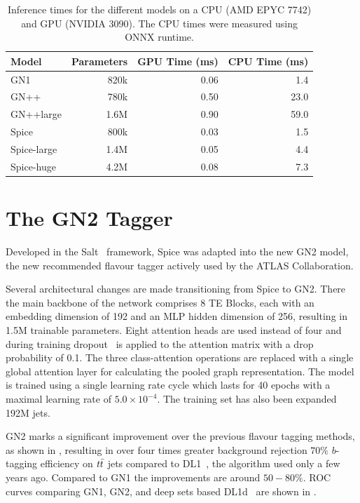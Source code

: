 \begin{table}[h!]
    \centering
    \begin{tabular}{lrrr}
        \toprule
        Model       & Parameters & GPU Time (ms) & CPU Time (ms) \\
        \midrule
        GN1         & 820k       & 0.06          & 1.4           \\
        GN++        & 780k       & 0.50          & 23.0          \\
        GN++large   & 1.6M       & 0.90          & 59.0          \\
        Spice       & 800k       & 0.03          & 1.5           \\
        Spice-large & 1.4M       & 0.05          & 4.4           \\
        Spice-huge  & 4.2M       & 0.08          & 7.3           \\
        \bottomrule
    \end{tabular}
    \caption{Inference times for the different models on a CPU (AMD EPYC 7742) and GPU (NVIDIA 3090). The CPU times were measured using ONNX runtime.}
    \label{tab:inference}
\end{table}

\FloatBarrier

\section{The GN2 Tagger}

Developed in the Salt~\cite{Salt} framework, Spice was adapted into the new GN2 model, the new recommended flavour tagger actively used by the ATLAS Collaboration.

Several architectural changes are made transitioning from Spice to GN2.
There the main backbone of the network comprises 8 TE Blocks, each with an embedding dimension of 192 and an MLP hidden dimension of 256, resulting in 1.5M trainable parameters.
Eight attention heads are used instead of four and during training dropout~\cite{Dropout} is applied to the attention matrix with a drop probability of 0.1.
The three class-attention operations are replaced with a single global attention layer for calculating the pooled graph representation.
The model is trained using a single learning rate cycle which lasts for 40 epochs with a maximal learning rate of $5.0 \times 10^{-4}$.
The training set has also been expanded 192M jets.

GN2 marks a significant improvement over the previous flavour tagging methods, as shown in , resulting in over four times greater background rejection $70\%$ $b$-tagging efficiency on $t\bar{t}$ jets compared to DL1~\cite{DL1}, the algorithm used only a few years ago.
Compared to GN1 the improvements are around $50-80\%$.
ROC curves comparing GN1, GN2, and deep sets based DL1d~\cite{DL1D}  are shown in .

